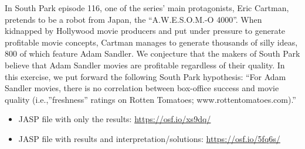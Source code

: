 \documentclass[
]{book}
\providecommand{\tightlist}{%
  \setlength{\itemsep}{0pt}\setlength{\parskip}{0pt}}
\begin{document}
In South Park episode 116, one of the series' main protagonists, Eric Cartman, pretends to be a robot from Japan, the ``A.W.E.S.O.M.-O 4000''. When kidnapped by Hollywood movie producers and put under pressure to generate profitable movie concepts, Cartman manages to generate thousands of silly ideas, 800 of which feature Adam Sandler. We conjecture that the makers of South Park believe that Adam Sandler movies are
profitable regardless of their quality. In this exercise, we put forward the following South Park hypothesis: ``For Adam Sandler movies, there is no correlation between box-office success and movie quality (i.e.,''freshness'' ratings on Rotten Tomatoes; www.rottentomatoes.com).''

\begin{itemize}
\tightlist
\item
  JASP file with only the results: \url{https://osf.io/xs9dq/}
\item
  JASP file with results and interpretation/solutions: \url{https://osf.io/5fq6s/}
\end{itemize}
\end{document}
